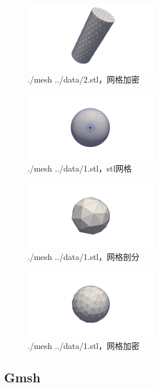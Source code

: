 \begin{figure}[!htbp]
  \centering
  \includegraphics[height=3cm]{fig/1/1.1.4/3.png}
  \caption{./mesh ../data/2.stl，网格加密}
  \label{fig:1-7}
\end{figure}

\begin{figure}[!htbp]
  \centering
  \includegraphics[height=3cm]{fig/1/1.1.4/4.png}
  \caption{./mesh ../data/1.stl，stl网格}
  \label{fig:1-7}
\end{figure}

\begin{figure}[!htbp]
  \centering
  \includegraphics[height=3cm]{fig/1/1.1.4/5.png}
  \caption{./mesh ../data/1.stl，网格剖分}
  \label{fig:1-7}
\end{figure}

\begin{figure}[!htbp]
  \centering
  \includegraphics[height=3cm]{fig/1/1.1.4/6.png}
  \caption{./mesh ../data/1.stl，网格加密}
  \label{fig:1-7}
\end{figure}

\subsection{Gmsh}


